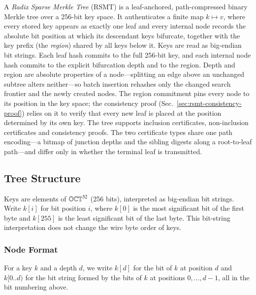 A \emph{Radix Sparse Merkle Tree} (RSMT) is a leaf-anchored, path-compressed binary Merkle tree over a 256-bit key space. It authenticates a finite map $k \mapsto v$, where every stored key appears as exactly one leaf and every internal node records the absolute bit position at which its descendant keys bifurcate, together with the key prefix (the \emph{region}) shared by all keys below it. Keys are read as big-endian bit strings. Each leaf hash commits to the full 256-bit key, and each internal node hash commits to the explicit bifurcation depth and to the region. Depth and region are absolute properties of a node---splitting an edge above an unchanged subtree alters neither---so batch insertion rehashes only the changed search frontier and the newly created nodes. The region commitment pins every node to its position in the key space; the consistency proof (Sec.~\ref{sec:rsmt-consistency-proof}) relies on it to verify that every new leaf is placed at the position determined by its own key. The tree supports inclusion certificates, non-inclusion certificates and consistency proofs. The two certificate types share one path encoding---a bitmap of junction depths and the sibling digests along a root-to-leaf path---and differ only in whether the terminal leaf is transmitted.

\subsection{Tree Structure}

Keys are elements of $\mathbb{OCT}^{32}$ (256 bits), interpreted as big-endian bit strings. Write $k[i]$ for bit position $i$, where $k[0]$ is the most significant bit of the first byte and $k[255]$ is the least significant bit of the last byte. This bit-string interpretation does not change the wire byte order of keys.

\subsubsection{Node Format}\label{sec:rsmt-node-format}

For a key $k$ and a depth $d$, we write $k[d]$ for the bit of $k$ at position $d$ and $k[0..d)$ for the bit string formed by the bits of $k$ at positions $0, \ldots, d-1$, all in the bit numbering above.


